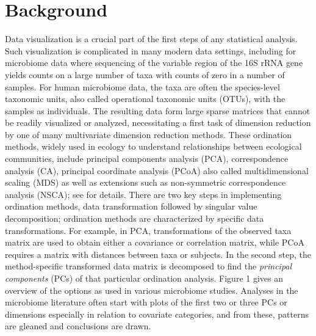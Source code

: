 \documentclass[doublespacing]{bmcart}
\def\texttt{[image: ]}
\begin{document}

\section*{Background}

Data visualization is a crucial part of the first steps of any statistical analysis. Such visualization is complicated in many modern data settings, including for microbiome data where sequencing of the variable region of the 16S rRNA gene yields counts on a large number of taxa with counts of zero in a number of samples. For human microbiome data, the taxa are often the species-level taxonomic units, also called operational taxonomic units (OTUs), with the samples as individuals.  The resulting data form large sparse matrices that cannot be readily visualized or analyzed, necessitating a first task of dimension reduction by one of many multivariate dimension reduction methods. These ordination methods, widely used in ecology to understand relationships between ecological communities, include principal components analysis (PCA), correspondence analysis (CA), principal coordinate analysis (PCoA) also called multidimensional scaling (MDS) as well as extensions such as non-symmetric correspondence analysis (NSCA); see \cite{Legendre} for details.  There are two key steps in implementing ordination methods, data transformation followed by singular value decomposition;  ordination methods are characterized by specific data transformations. For example, in PCA,  transformations of the observed taxa matrix are used to obtain either a covariance or correlation matrix, while PCoA requires a matrix with distances between taxa or subjects. In the second step, the method-specific transformed data matrix is decomposed to find the {\it principal components} (PCs) of that particular ordination analysis. Figure 1 gives an overview of the options as used in various microbiome studies. Analyses in the microbiome literature often start with plots of the first two or three PCs or dimensions especially in relation to covariate categories, and from these, patterns are gleaned and conclusions are drawn.

\end{document}
